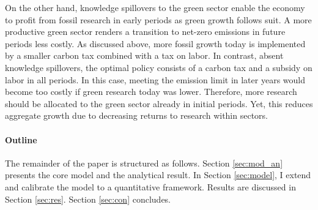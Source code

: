 On the other hand, knowledge spillovers to the green sector enable the economy to profit from fossil research in early periods as green growth follows suit. A more productive green sector renders a transition to net-zero emissions in future periods less costly. As discussed above, more fossil growth today is implemented by a smaller carbon tax combined with a tax on labor. In contrast, absent knowledge spillovers, the optimal policy consists of a carbon tax and a subsidy on labor in all periods. In this case, meeting the emission limit in later years would become too costly if green research today was lower. Therefore, more research should be allocated to the green sector already in initial periods. Yet, this reduces aggregate growth due to decreasing returns to research within sectors. 



\paragraph{Outline}
The remainder of the paper is structured as follows. Section \ref{sec:mod_an} presents the core model and the analytical result. In Section \ref{sec:model}, I extend and calibrate the model to a quantitative framework.  Results are discussed  in Section \ref{sec:res}. Section \ref{sec:con} concludes.